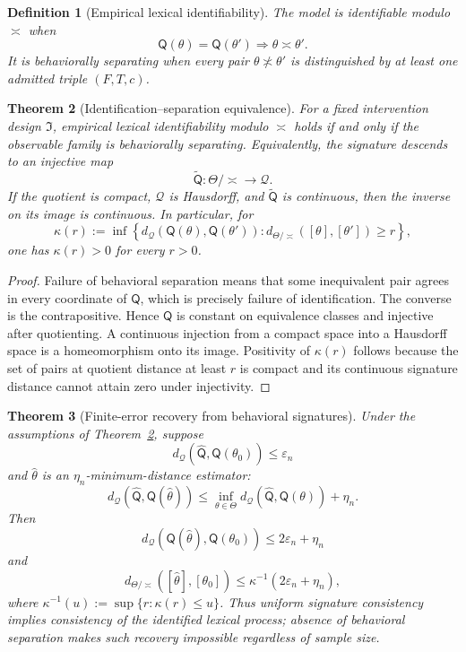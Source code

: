 \documentclass[11pt]{article}
\newtheorem{definition}{Definition}[section]
\newtheorem{theorem}[definition]{Theorem}
\begin{document}
{\begin{definition}[Empirical lexical identifiability]
The model is identifiable modulo $\asymp$ when
\[
 \mathsf Q(\theta)=\mathsf Q(\theta')
 \Longrightarrow\theta\asymp\theta'.
\]
It is behaviorally separating when every pair $\theta\not\asymp\theta'$ is distinguished by at least one admitted triple $(F,T,c)$.
\end{definition}

\begin{theorem}[Identification--separation equivalence]\label{thm:id-separation}
For a fixed intervention design $\mathfrak I$, empirical lexical identifiability modulo $\asymp$ holds if and only if the observable family is behaviorally separating. Equivalently, the signature descends to an injective map
\[
 \widetilde{\mathsf Q}:\Theta/{\asymp}\longrightarrow\mathcal Q.
\]
If the quotient is compact, $\mathcal Q$ is Hausdorff, and $\widetilde{\mathsf Q}$ is continuous, then the inverse on its image is continuous. In particular, for
\[
 \kappa(r):=
 \inf\left\{
 d_{\mathcal Q}(\mathsf Q(\theta),\mathsf Q(\theta')):
 d_{\Theta/{\asymp}}([\theta],[\theta'])\ge r
 \right\},
\]
one has $\kappa(r)>0$ for every $r>0$.
\end{theorem}

\begin{proof}
Failure of behavioral separation means that some inequivalent pair agrees in every coordinate of $\mathsf Q$, which is precisely failure of identification. The converse is the contrapositive. Hence $\mathsf Q$ is constant on equivalence classes and injective after quotienting. A continuous injection from a compact space into a Hausdorff space is a homeomorphism onto its image. Positivity of $\kappa(r)$ follows because the set of pairs at quotient distance at least $r$ is compact and its continuous signature distance cannot attain zero under injectivity.
\end{proof}

\begin{theorem}[Finite-error recovery from behavioral signatures]\label{thm:id-rate}
Under the assumptions of Theorem~\ref{thm:id-separation}, suppose
\[
 d_{\mathcal Q}(\widehat{\mathsf Q},\mathsf Q(\theta_0))
 \le\varepsilon_n
\]
and $\widehat\theta$ is an $\eta_n$-minimum-distance estimator:
\[
 d_{\mathcal Q}(\widehat{\mathsf Q},\mathsf Q(\widehat\theta))
 \le
 \inf_{\theta\in\Theta}
 d_{\mathcal Q}(\widehat{\mathsf Q},\mathsf Q(\theta))
 +\eta_n.
\]
Then
\[
 d_{\mathcal Q}(\mathsf Q(\widehat\theta),\mathsf Q(\theta_0))
 \le2\varepsilon_n+\eta_n
\]
and
\[
 d_{\Theta/{\asymp}}([\widehat\theta],[\theta_0])
 \le
 \kappa^{-1}(2\varepsilon_n+\eta_n),
\]
where $\kappa^{-1}(u):=\sup\{r:\kappa(r)\le u\}$. Thus uniform signature consistency implies consistency of the identified lexical process; absence of behavioral separation makes such recovery impossible regardless of sample size.
\end{theorem}

}
\end{document}
